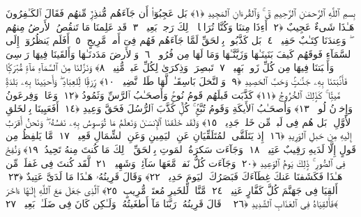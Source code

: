 
  
    
  
    
    

\nopagebreak
  بِسمِ ٱللَّهِ ٱلرَّحمَـٰنِ ٱلرَّحِيمِ
  قٓ ۚ وَٱلقُرءَانِ ٱلمَجِيدِ ﴿١﴾
 بَل عَجِبُوٓا۟ أَن جَآءَهُم مُّنذِرٌۭ مِّنهُم فَقَالَ ٱلكَـٰفِرُونَ هَـٰذَا شَىءٌ عَجِيبٌ ﴿٢﴾
 أَءِذَا مِتنَا وَكُنَّا تُرَابًۭا ۖ ذَٟلِكَ رَجعٌۢ بَعِيدٌۭ ﴿٣﴾
 قَد عَلِمنَا مَا تَنقُصُ ٱلأَرضُ مِنهُم ۖ وَعِندَنَا كِتَـٰبٌ حَفِيظٌۢ ﴿٤﴾
 بَل كَذَّبُوا۟ بِٱلحَقِّ لَمَّا جَآءَهُم فَهُم فِىٓ أَمرٍۢ مَّرِيجٍ ﴿٥﴾
 أَفَلَم يَنظُرُوٓا۟ إِلَى ٱلسَّمَآءِ فَوقَهُم كَيفَ بَنَينَـٰهَا وَزَيَّنَّـٰهَا وَمَا لَهَا مِن فُرُوجٍۢ ﴿٦﴾
 وَٱلأَرضَ مَدَدنَـٰهَا وَأَلقَينَا فِيهَا رَوَٟسِىَ وَأَنۢبَتنَا فِيهَا مِن كُلِّ زَوجٍۭ بَهِيجٍۢ ﴿٧﴾
 تَبصِرَةًۭ وَذِكرَىٰ لِكُلِّ عَبدٍۢ مُّنِيبٍۢ ﴿٨﴾
 وَنَزَّلنَا مِنَ ٱلسَّمَآءِ مَآءًۭ مُّبَٰرَكًۭا فَأَنۢبَتنَا بِهِۦ جَنَّـٰتٍۢ وَحَبَّ ٱلحَصِيدِ ﴿٩﴾
 وَٱلنَّخلَ بَاسِقَـٰتٍۢ لَّهَا طَلعٌۭ نَّضِيدٌۭ ﴿١٠﴾
 رِّزقًۭا لِّلعِبَادِ ۖ وَأَحيَينَا بِهِۦ بَلدَةًۭ مَّيتًۭا ۚ كَذَٟلِكَ ٱلخُرُوجُ ﴿١١﴾
 كَذَّبَت قَبلَهُم قَومُ نُوحٍۢ وَأَصحَـٰبُ ٱلرَّسِّ وَثَمُودُ ﴿١٢﴾
 وَعَادٌۭ وَفِرعَونُ وَإِخوَٟنُ لُوطٍۢ ﴿١٣﴾
 وَأَصحَـٰبُ ٱلأَيكَةِ وَقَومُ تُبَّعٍۢ ۚ كُلٌّۭ كَذَّبَ ٱلرُّسُلَ فَحَقَّ وَعِيدِ ﴿١٤﴾
 أَفَعَيِينَا بِٱلخَلقِ ٱلأَوَّلِ ۚ بَل هُم فِى لَبسٍۢ مِّن خَلقٍۢ جَدِيدٍۢ ﴿١٥﴾
 وَلَقَد خَلَقنَا ٱلإِنسَـٰنَ وَنَعلَمُ مَا تُوَسوِسُ بِهِۦ نَفسُهُۥ ۖ وَنَحنُ أَقرَبُ إِلَيهِ مِن حَبلِ ٱلوَرِيدِ ﴿١٦﴾
 إِذ يَتَلَقَّى ٱلمُتَلَقِّيَانِ عَنِ ٱليَمِينِ وَعَنِ ٱلشِّمَالِ قَعِيدٌۭ ﴿١٧﴾
 مَّا يَلفِظُ مِن قَولٍ إِلَّا لَدَيهِ رَقِيبٌ عَتِيدٌۭ ﴿١٨﴾
 وَجَآءَت سَكرَةُ ٱلمَوتِ بِٱلحَقِّ ۖ ذَٟلِكَ مَا كُنتَ مِنهُ تَحِيدُ ﴿١٩﴾
 وَنُفِخَ فِى ٱلصُّورِ ۚ ذَٟلِكَ يَومُ ٱلوَعِيدِ ﴿٢٠﴾
 وَجَآءَت كُلُّ نَفسٍۢ مَّعَهَا سَآئِقٌۭ وَشَهِيدٌۭ ﴿٢١﴾
 لَّقَد كُنتَ فِى غَفلَةٍۢ مِّن هَـٰذَا فَكَشَفنَا عَنكَ غِطَآءَكَ فَبَصَرُكَ ٱليَومَ حَدِيدٌۭ ﴿٢٢﴾
 وَقَالَ قَرِينُهُۥ هَـٰذَا مَا لَدَىَّ عَتِيدٌ ﴿٢٣﴾
 أَلقِيَا فِى جَهَنَّمَ كُلَّ كَفَّارٍ عَنِيدٍۢ ﴿٢٤﴾
 مَّنَّاعٍۢ لِّلخَيرِ مُعتَدٍۢ مُّرِيبٍ ﴿٢٥﴾
 ٱلَّذِى جَعَلَ مَعَ ٱللَّهِ إِلَـٰهًا ءَاخَرَ فَأَلقِيَاهُ فِى ٱلعَذَابِ ٱلشَّدِيدِ ﴿٢٦﴾
 ۞ قَالَ قَرِينُهُۥ رَبَّنَا مَآ أَطغَيتُهُۥ وَلَـٰكِن كَانَ فِى ضَلَـٰلٍۭ بَعِيدٍۢ ﴿٢٧﴾
